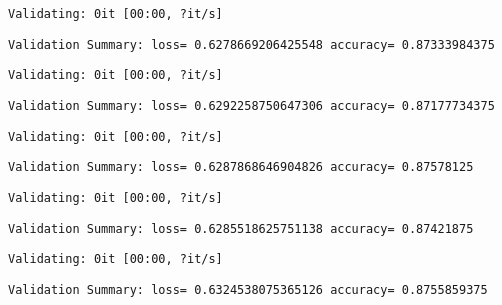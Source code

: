 \documentclass[11pt]{article}
\begin{document}
    
    \begin{Verbatim}[commandchars=\\\{\}]
Validating: 0it [00:00, ?it/s]
    \end{Verbatim}

    
    \begin{Verbatim}[commandchars=\\\{\}]
Validation Summary: loss= 0.6278669206425548 accuracy= 0.87333984375
    \end{Verbatim}

    
    \begin{Verbatim}[commandchars=\\\{\}]
Validating: 0it [00:00, ?it/s]
    \end{Verbatim}

    
    \begin{Verbatim}[commandchars=\\\{\}]
Validation Summary: loss= 0.6292258750647306 accuracy= 0.87177734375
    \end{Verbatim}

    
    \begin{Verbatim}[commandchars=\\\{\}]
Validating: 0it [00:00, ?it/s]
    \end{Verbatim}

    
    \begin{Verbatim}[commandchars=\\\{\}]
Validation Summary: loss= 0.6287868646904826 accuracy= 0.87578125
    \end{Verbatim}

    
    \begin{Verbatim}[commandchars=\\\{\}]
Validating: 0it [00:00, ?it/s]
    \end{Verbatim}

    
    \begin{Verbatim}[commandchars=\\\{\}]
Validation Summary: loss= 0.6285518625751138 accuracy= 0.87421875
    \end{Verbatim}

    
    \begin{Verbatim}[commandchars=\\\{\}]
Validating: 0it [00:00, ?it/s]
    \end{Verbatim}

    
    \begin{Verbatim}[commandchars=\\\{\}]
Validation Summary: loss= 0.6324538075365126 accuracy= 0.8755859375
    \end{Verbatim}
\end{document}
